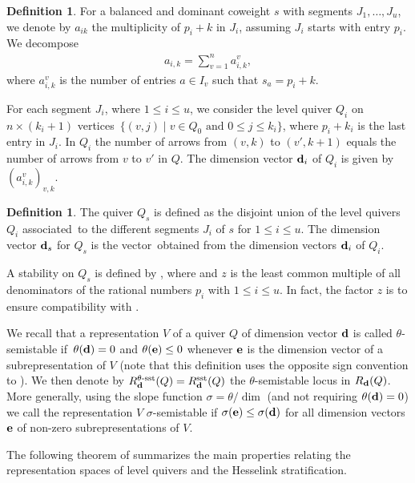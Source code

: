 \documentclass[pdftex]{sigma}
\numberwithin{equation}{section}
\theoremstyle{definition}
\newtheorem{Definition}[Theorem]{Definition}
\begin{document}
\begin{Definition}
For a balanced and dominant coweight $s$ with segments $J_1, \dots, J_u$, we denote by $a_{ik}$ the multiplicity of $p_i +k$ in $J_i$, assuming $J_i$ starts with entry $p_i$. We decompose
\begin{align*}
a_{i,k} = \sum_{v=1}^n a_{i,k}^v ,
\end{align*}
where $a_{i,k}^v$ is the number of entries $a \in I_v$ such that $s_a = p_i +k$.

For each segment $J_i$, where $1 \leq i \leq u$, we consider the level quiver $Q_i$ on $n \times (k_{i} +1)$ vertices~${
\{ (v,j) \mid v \in Q_0 \text{ and } 0\leq j \leq k_i \} }$,
where $p_i +k_i$ is the last entry in $J_i$. In $Q_i$ the number of arrows from $(v,k)$ to $(v',k+1)$ equals the number of arrows from $v$ to $v'$ in $Q$. The dimension vector ${\bf d}_i$ of $Q_i$ is given by $(a_{i,k}^v)_{v,k}$.
\end{Definition}

\begin{Definition}\label{levelquiver}
The quiver $Q_s$ is defined as the disjoint union of the level quivers $Q_i$ associated~to the different segments $J_i$ of $s$ for $1 \leq i \leq u$. The dimension vector ${\bf d}_{s}$ for $Q_{s}$ is the vector~obtained from the dimension vectors ${\bf d}_i$ of $Q_i$.

A stability on $Q_{s}$ is defined by , where  and $z$ is the least common multiple of all denominators of the rational numbers $p_i$ with $1 \leq i \leq u$. In fact, the factor $z$ is to ensure compatibility with \cite{LB}.
\end{Definition}

We recall that a representation $V$ of a quiver $Q$ of dimension vector ${\bf d}$ is called $\theta$-semistable if~${\theta({\bf d})=0}$ and $\theta({\bf e})\leq 0$ whenever ${\bf e}$ is the dimension vector of a subrepresentation of $V$ (note that this definition uses the opposite sign convention to \cite{LB}). We then denote by $R_{\bf d}^{\theta\text{\rm -sst}}(Q)=R_{\bf d}^{\mathrm{sst}}(Q)$ the $\theta$-semistable locus in $R_{\bf d}(Q)$. More generally, using the slope function $\sigma=\theta/{\dim}$ (and not requiring $\theta({\bf d})=0$) we call the representation $V$ $\sigma$-semistable if $\sigma({\bf e})\leq\sigma({\bf d})$ for all dimension vectors ${\bf e}$ of non-zero subrepresentations of $V$.

The following theorem of \cite{LB} summarizes the main properties relating the representation spaces of level quivers and the Hesselink stratification.
\end{document}
